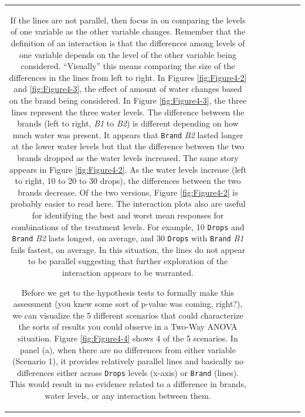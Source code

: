\documentclass[]{book}
\theoremstyle{definition}
\theoremstyle{definition}
\theoremstyle{remark}
\begin{document}
\begin{longtable}[]{@{}ccccccc@{}}
\begin{minipage}[b]{0.10\columnwidth}
If the lines are not parallel, then focus in on comparing the levels of
one variable as the other variable changes. Remember that the definition
of an interaction is that the differences among levels of one variable
depends on the level of the other variable being considered.
``Visually'' this means comparing the size of the differences in the
lines from left to right. In Figures \ref{fig:Figure4-2} and
\ref{fig:Figure4-3}, the effect of amount of water changes based on the
brand being considered. In Figure \ref{fig:Figure4-3}, the three lines
represent the three water levels. The difference between the brands
(left to right, \emph{B1} to \emph{B2}) is different depending on how
much water was present. It appears that \texttt{Brand} \emph{B2} lasted
longer at the lower water levels but that the difference between the two
brands dropped as the water levels increased. The same story appears in
Figure \ref{fig:Figure4-2}. As the water levels increase (left to right,
10 to 20 to 30 drops), the differences between the two brands decrease.
Of the two versions, Figure \ref{fig:Figure4-2} is probably easier to
read here. The interaction plots also are useful for identifying the
best and worst mean responses for combinations of the treatment levels.
For example, 10 \texttt{Drops} and \texttt{Brand} \emph{B2} lasts
longest, on average, and 30 \texttt{Drops} with \texttt{Brand} \emph{B1}
fails fastest, on average. In this situation, the lines do not appear to
be parallel suggesting that further exploration of the interaction
appears to be warranted.

Before we get to the hypothesis tests to formally make this assessment
(you knew some sort of p-value was coming, right?), we can visualize the
5 different scenarios that could characterize the sorts of results you
could observe in a Two-Way ANOVA situation. Figure \ref{fig:Figure4-4}
shows 4 of the 5 scenarios. In panel (a), when there are no differences
from either variable (Scenario 1), it provides relatively parallel lines
and basically no differences either across \texttt{Drops} levels
(x-axis) or \texttt{Brand} (lines). This would result in no evidence
related to a difference in brands, water levels, or any interaction
between them.





\end{minipage}
\end{longtable}
\end{document}
